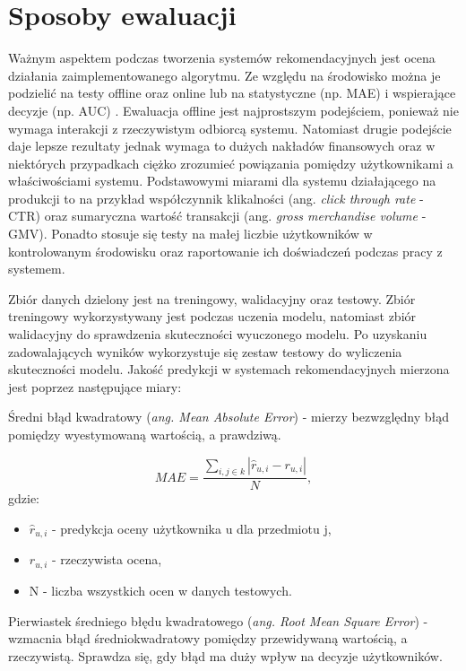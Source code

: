 \section{Sposoby ewaluacji}\label{metryki}

Ważnym aspektem podczas tworzenia systemów rekomendacyjnych jest ocena działania zaimplementowanego algorytmu. Ze względu na środowisko można je podzielić na testy offline oraz online lub na statystyczne (np. MAE) i wspierające decyzje (np. AUC) \cite{herlocker}. Ewaluacja offline jest najprostszym podejściem, ponieważ nie wymaga interakcji z rzeczywistym odbiorcą systemu. Natomiast drugie podejście daje lepsze rezultaty jednak wymaga to dużych nakładów finansowych oraz w niektórych przypadkach ciężko zrozumieć powiązania pomiędzy użytkownikami a właściwościami systemu. Podstawowymi miarami dla systemu działającego na produkcji to na przykład współczynnik klikalności (ang. \textit{click through rate} - CTR) oraz sumaryczna wartość transakcji (ang. \textit{gross merchandise volume} - GMV). Ponadto stosuje się testy na małej liczbie użytkowników w kontrolowanym środowisku oraz raportowanie ich doświadczeń podczas pracy z systemem.

Zbiór danych dzielony jest na treningowy, walidacyjny oraz testowy. Zbiór treningowy wykorzystywany jest podczas uczenia modelu, natomiast zbiór walidacyjny do sprawdzenia skuteczności wyuczonego modelu. Po uzyskaniu zadowalających wyników wykorzystuje się zestaw testowy do wyliczenia skuteczności modelu. Jakość predykcji w systemach rekomendacyjnych mierzona jest poprzez następujące miary:

Średni błąd kwadratowy (\textit{ang. Mean Absolute Error}) - mierzy bezwzględny błąd pomiędzy wyestymowaną wartością, a prawdziwą.

\begin{equation}
    MAE = \frac{\sum\limits_{i,j\in{k}}|\hat{r}_{u,i} - r_{u,i}|}{N},
\end{equation} gdzie:
\begin{itemize}
    \item $\hat{r}_{u,i}$ - predykcja oceny użytkownika u dla przedmiotu j,
    \item $r_{u,i}$ - rzeczywista ocena,
    \item N - liczba wszystkich ocen w danych testowych.
\end{itemize}

Pierwiastek średniego błędu kwadratowego (\textit{ang. Root Mean Square Error}) - wzmacnia błąd średniokwadratowy pomiędzy przewidywaną wartością, a rzeczywistą. Sprawdza się, gdy błąd ma duży wpływ na decyzje użytkowników.


